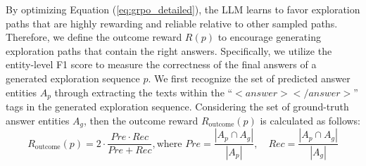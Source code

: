 By optimizing Equation (\ref{eq:grpo_detailed}), the LLM learns to favor exploration paths that are highly rewarding and reliable relative to other sampled paths.
Therefore, we define the outcome reward $R(p)$ to encourage generating exploration
paths that contain the right answers.
Specifically, we utilize the entity-level F1 score to
measure the correctness of the final answers of a generated exploration sequence $p$.
We first recognize the set of predicted answer entities $A_p$ through extracting the texts within the ``$<answer></answer>$'' tags in the generated exploration sequence.
Considering the set of ground-truth answer entities $A_g$, then the outcome reward $R_{\textrm{outcome}}(p)$  is calculated as follows:
 \begin{equation}
 R_{\textrm{outcome}}(p)  = 2 \cdot \frac{Pre \cdot Rec}{Pre + Rec}, \textrm{where } Pre = \frac{|A_p \cap A_g|}{|A_p|}, \quad Rec = \frac{|A_p \cap A_g|}{|A_g|}
 \end{equation}

